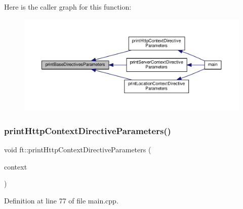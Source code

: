 Here is the caller graph for this function\+:
\nopagebreak
\begin{figure}[H]
\begin{center}
\leavevmode
\includegraphics[width=350pt]{namespaceft_af12105e484dbac115fe1d6a4ff074f27_icgraph}
\end{center}
\end{figure}
\mbox{\label{namespaceft_a227dfbe1be478e0415b853df46dec985}} 
\subsubsection{\texorpdfstring{print\+Http\+Context\+Directive\+Parameters()}{printHttpContextDirectiveParameters()}}
{\footnotesize\ttfamily void ft\+::print\+Http\+Context\+Directive\+Parameters (\begin{DoxyParamCaption}\item[{\hyperlink{classft_1_1_http_block}{ft\+::\+Http\+Block} \&}]{context }\end{DoxyParamCaption})}



Definition at line 77 of file main.\+cpp.


